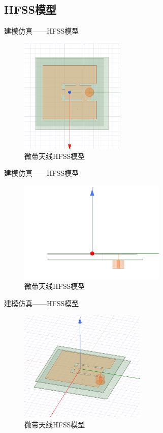 \documentclass[10pt]{beamer}
\begin{document}
\subsection*{HFSS模型}
\begin{frame}{建模仿真——{\normalsize HFSS模型}}
	\begin{figure}[htbp]
		\centering
		\includegraphics[width=5cm]{figs/4.png}
		\caption{微带天线HFSS模型}
		\label{f2}
	\end{figure}
\end{frame}

\begin{frame}{建模仿真——{\normalsize HFSS模型}}
	\begin{figure}[htbp]
		\centering
		\includegraphics[width=7cm]{figs/5.png}
		\caption{微带天线HFSS模型}
		\label{f2}
	\end{figure}
\end{frame}

\begin{frame}{建模仿真——{\normalsize HFSS模型}}
	\begin{figure}[htbp]
		\centering
		\includegraphics[width=6cm]{figs/6.png}
		\caption{微带天线HFSS模型}
		\label{f2}
	\end{figure}
\end{frame}
\end{document}
